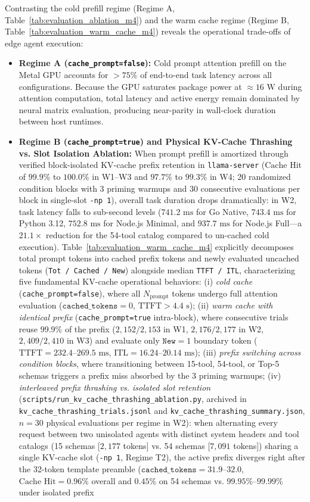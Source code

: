 \documentclass[11pt,a4paper]{article}
\begin{document}
Contrasting the cold prefill regime (Regime A, Table~\ref{tab:evaluation_ablation_m4}) and the warm cache regime (Regime B, Table~\ref{tab:evaluation_warm_cache_m4}) reveals the operational trade-offs of edge agent execution:
\begin{itemize}
    \item \textbf{Regime A (\texttt{cache\_prompt=false}):} Cold prompt attention prefill on the Metal GPU accounts for $>75\%$ of end-to-end task latency across all configurations. Because the GPU saturates package power at $\approx 16\text{ W}$ during attention computation, total latency and active energy remain dominated by neural matrix evaluation, producing near-parity in wall-clock duration between host runtimes.
    \item \textbf{Regime B (\texttt{cache\_prompt=true}) and Physical KV-Cache Thrashing vs. Slot Isolation Ablation:} When prompt prefill is amortized through verified block-isolated KV-cache prefix retention in \texttt{llama-server} ($\text{Cache Hit}$ of $99.9\%$ to $100.0\%$ in W1--W3 and $97.7\%$ to $99.3\%$ in W4; 20 randomized condition blocks with 3 priming warmups and 30 consecutive evaluations per block in single-slot \texttt{-np 1}), overall task duration drops dramatically: in W2, task latency falls to sub-second levels ($741.2\text{ ms}$ for Go Native, $743.4\text{ ms}$ for Python 3.12, $752.8\text{ ms}$ for Node.js Minimal, and $937.7\text{ ms}$ for Node.js Full---a $21.1\times$ reduction for the 54-tool catalog compared to un-cached cold execution). Table~\ref{tab:evaluation_warm_cache_m4} explicitly decomposes total prompt tokens into cached prefix tokens and newly evaluated uncached tokens (\texttt{Tot / Cached / New}) alongside median \texttt{TTFT / ITL}, characterizing five fundamental KV-cache operational behaviors: (i) \textit{cold cache} (\texttt{cache\_prompt=false}), where all $N_{\text{prompt}}$ tokens undergo full attention evaluation ($\texttt{cached\_tokens}=0$, $\text{TTFT} > 4.4\text{ s}$); (ii) \textit{warm cache with identical prefix} (\texttt{cache\_prompt=true} intra-block), where consecutive trials reuse $99.9\%$ of the prefix ($2{,}152 / 2{,}153$ in W1, $2{,}176 / 2{,}177$ in W2, $2{,}409 / 2{,}410$ in W3) and evaluate only $\texttt{New}=1$ boundary token ($\text{TTFT} = 232.4\text{--}269.5\text{ ms}$, $\text{ITL} = 16.24\text{--}20.14\text{ ms}$); (iii) \textit{prefix switching across condition blocks}, where transitioning between 15-tool, 54-tool, or Top-5 schemas triggers a prefix miss absorbed by the 3 priming warmups; (iv) \textit{interleaved prefix thrashing vs. isolated slot retention} (\texttt{scripts/run\_kv\_cache\_thrashing\_ablation.py}, archived in \texttt{kv\_cache\_thrashing\_trials.jsonl} and \texttt{kv\_cache\_thrashing\_summary.json}, $n=30$ physical evaluations per regime in W2): when alternating every request between two unisolated agents with distinct system headers and tool catalogs (15 schemas [$2{,}177$ tokens] vs. 54 schemas [$7{,}091$ tokens]) sharing a single KV-cache slot (\texttt{-np 1}, Regime T2), the active prefix diverges right after the 32-token template preamble ($\texttt{cached\_tokens} = 31.9\text{--}32.0$, $\text{Cache Hit} = 0.96\%$ overall and $0.45\%$ on 54 schemas vs. $99.95\%\text{--}99.99\%$ under isolated prefix 
\end{itemize}
\end{document}
